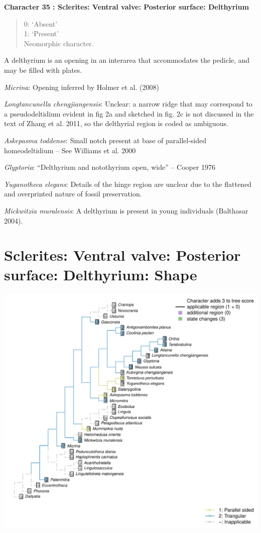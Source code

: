 \documentclass[]{book}
\theoremstyle{definition}
\theoremstyle{definition}
\theoremstyle{definition}
\theoremstyle{remark}
\begin{document}
\textbf{Character 35 : Sclerites: Ventral valve: Posterior surface:
Delthyrium }

\begin{quote}
0: `Absent'\\
1: `Present'\\
Neomorphic character.
\end{quote}

A delthyrium is an opening in an interarea that accommodates the
pedicle, and may be filled with plates.

\emph{Micrina}: Opening inferred by Holmer et al. (2008)

\emph{Longtancunella chengjiangensis}: Unclear: a narrow ridge that may
correspond to a pseudodeltidium evident in fig 2a and sketched in fig.
2c is not discussed in the text of Zhang et al. 2011, so the delthyrial
region is coded as ambiguous.

\emph{Askepasma toddense}: Small notch present at base of parallel-sided
homeodeltidium -- See Williams et al. 2000

\emph{Glyptoria}: ``Delthyrium and notothyrium open, wide'' -- Cooper
1976

\emph{Yuganotheca elegans}: Details of the hinge region are unclear due
to the flattened and overprinted nature of fossil preservation.

\emph{Mickwitzia muralensis}: A delthyrium is present in young
individuals (Balthasar 2004).

\hypertarget{sclerites-ventral-valve-posterior-surface-delthyrium-shape}{%
\section*{Sclerites: Ventral valve: Posterior surface: Delthyrium:
Shape}\label{sclerites-ventral-valve-posterior-surface-delthyrium-shape}}

\includegraphics{Brachiopod_phylogeny_files/figure-latex/unnamed-chunk-5-36.pdf}
\end{document}
